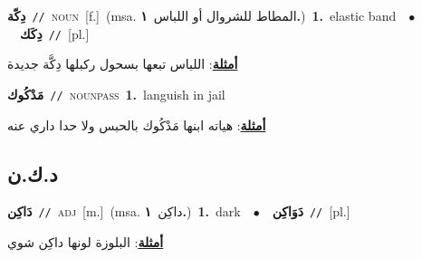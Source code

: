 \documentclass[10pt,a4paper,twoside]{article} %
\begin{document}
\begin{multicols}{2}
{\setlength\topsep{0pt}\textbf{\foreignlanguage{arabic}{دِكّة}}\ {\color{gray}\texttt{//}\color{black}}\ \textsc{noun}\ [f.]\ \color{gray}(msa. \foreignlanguage{arabic}{المطاط للشروال أو اللباس}~\foreignlanguage{arabic}{\textbf{١.}})\color{black}\ \textbf{1.}~elastic band\ \ $\bullet$\ \ \setlength\topsep{0pt}\textbf{\foreignlanguage{arabic}{دِكَك}}\ {\color{gray}\texttt{//}\color{black}}\ [pl.]\  \begin{flushright}\color{gray}\foreignlanguage{arabic}{\textbf{\underline{\foreignlanguage{arabic}{أمثلة}}}: اللباس تبعها بسحول ركبلها دِكَّة جديدة}\end{flushright}\color{black}} \vspace{2mm}

{\setlength\topsep{0pt}\textbf{\foreignlanguage{arabic}{مَدْكُوك}}\ {\color{gray}\texttt{//}\color{black}}\ \textsc{noun\textunderscore pass}\ \textbf{1.}~languish in jail\  \begin{flushright}\color{gray}\foreignlanguage{arabic}{\textbf{\underline{\foreignlanguage{arabic}{أمثلة}}}: هياته ابنها مَدْكُوك بالحبس ولا حدا داري عنه}\end{flushright}\color{black}} \vspace{2mm}

\vspace{-3mm}
\subsection*{\color{blue}\foreignlanguage{arabic}{د.ك.ن}\color{blue}{}} 

{\setlength\topsep{0pt}\textbf{\foreignlanguage{arabic}{دَاكِن}}\ {\color{gray}\texttt{//}\color{black}}\ \textsc{adj}\ [m.]\ \color{gray}(msa. \foreignlanguage{arabic}{داكِن}~\foreignlanguage{arabic}{\textbf{١.}})\color{black}\ \textbf{1.}~dark\ \ $\bullet$\ \ \setlength\topsep{0pt}\textbf{\foreignlanguage{arabic}{دَوَاكِن}}\ {\color{gray}\texttt{//}\color{black}}\ [pl.]\  \begin{flushright}\color{gray}\foreignlanguage{arabic}{\textbf{\underline{\foreignlanguage{arabic}{أمثلة}}}: البلوزة لونها داكِن شوي}\end{flushright}\color{black}} \vspace{2mm}


\end{multicols}
\end{document}

